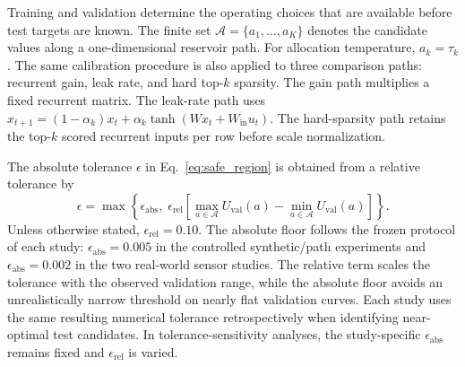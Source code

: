 \documentclass[11pt,a4paper]{article}
\begin{document}
Training and validation determine the operating choices that are available before test targets are known. The finite set $\mathcal A=\{a_1,\ldots,a_K\}$ denotes the candidate values along a one-dimensional reservoir path. For allocation temperature, $a_k=\tau_k$. The same calibration procedure is also applied to three comparison paths: recurrent gain, leak rate, and hard top-$k$ sparsity. The gain path multiplies a fixed recurrent matrix. The leak-rate path uses $x_{t+1}=(1-\alpha_k)x_t+\alpha_k\tanh(Wx_t+W_{\mathrm{in}}u_t)$. The hard-sparsity path retains the top-$k$ scored recurrent inputs per row before scale normalization.

The absolute tolerance $\epsilon$ in Eq.~\eqref{eq:safe_region} is obtained from a relative tolerance by
\begin{equation}
  \epsilon = \max\!\left\{\epsilon_{\mathrm{abs}},\;\epsilon_{\mathrm{rel}}\left[\max_{a\in\mathcal A}U_{\mathrm{val}}(a)-\min_{a\in\mathcal A}U_{\mathrm{val}}(a)\right]\right\}.
  \label{eq:tolerance_rule}
\end{equation}
Unless otherwise stated, $\epsilon_{\mathrm{rel}}=0.10$. The absolute floor follows the frozen protocol of each study: $\epsilon_{\mathrm{abs}}=0.005$ in the controlled synthetic/path experiments and $\epsilon_{\mathrm{abs}}=0.002$ in the two real-world sensor studies. The relative term scales the tolerance with the observed validation range, while the absolute floor avoids an unrealistically narrow threshold on nearly flat validation curves. Each study uses the same resulting numerical tolerance retrospectively when identifying near-optimal test candidates. In tolerance-sensitivity analyses, the study-specific $\epsilon_{\mathrm{abs}}$ remains fixed and $\epsilon_{\mathrm{rel}}$ is varied.
\end{document}
